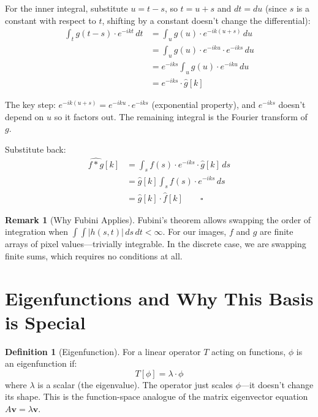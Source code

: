 \documentclass[11pt,a4paper]{article}
\theoremstyle{definition}
\newtheorem{definition}{Definition}[section]
\newtheorem{remark}{Remark}[section]
\begin{document}
For the inner integral, substitute $u = t - s$, so $t = u + s$ and $dt = du$ (since $s$ is a constant with respect to $t$, shifting by a constant doesn't change the differential):
\begin{align}
    \int_t g(t-s) \cdot e^{-ikt} \, dt &= \int_u g(u) \cdot e^{-ik(u+s)} \, du \\
    &= \int_u g(u) \cdot e^{-iku} \cdot e^{-iks} \, du \\
    &= e^{-iks} \int_u g(u) \cdot e^{-iku} \, du \\
    &= e^{-iks} \cdot \hat{g}[k]
\end{align}

The key step: $e^{-ik(u+s)} = e^{-iku} \cdot e^{-iks}$ (exponential property), and $e^{-iks}$ doesn't depend on $u$ so it factors out. The remaining integral is the Fourier transform of $g$.

Substitute back:
\begin{align}
    \widehat{f * g}[k] &= \int_s f(s) \cdot e^{-iks} \cdot \hat{g}[k] \, ds \\
    &= \hat{g}[k] \int_s f(s) \cdot e^{-iks} \, ds \\
    &= \hat{g}[k] \cdot \hat{f}[k] \qquad\square
\end{align}

\begin{remark}[Why Fubini Applies]
Fubini's theorem allows swapping the order of integration when $\int\!\!\int |h(s,t)| \, ds \, dt < \infty$. For our images, $f$ and $g$ are finite arrays of pixel values---trivially integrable. In the discrete case, we are swapping finite sums, which requires no conditions at all.
\end{remark}

\section{Eigenfunctions and Why This Basis is Special}

\begin{definition}[Eigenfunction]
For a linear operator $T$ acting on functions, $\phi$ is an eigenfunction if:
\begin{equation}
    T[\phi] = \lambda \cdot \phi
\end{equation}
where $\lambda$ is a scalar (the eigenvalue). The operator just scales $\phi$---it doesn't change its shape. This is the function-space analogue of the matrix eigenvector equation $A\mathbf{v} = \lambda\mathbf{v}$.
\end{definition}
\end{document}

